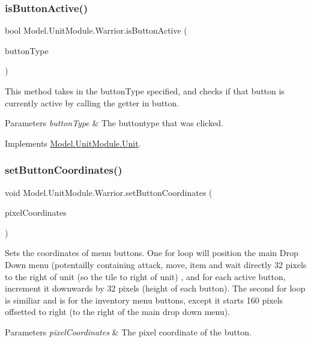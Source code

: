\subsubsection{\texorpdfstring{is\+Button\+Active()}{isButtonActive()}}
{\footnotesize\ttfamily bool Model.\+Unit\+Module.\+Warrior.\+is\+Button\+Active (\begin{DoxyParamCaption}\item[{\hyperlink{namespace_model_ac76b3489c9d704f49912608bd36cd0e7}{Button\+Type}}]{button\+Type }\end{DoxyParamCaption})\hspace{0.3cm}{\ttfamily [inline]}}

This method takes in the button\+Type specified, and checks if that button is currently active by calling the getter in button. 
\begin{DoxyParams}{Parameters}
{\em button\+Type} & The buttontype that was clicked. \\
\hline
\end{DoxyParams}


Implements \hyperlink{interface_model_1_1_unit_module_1_1_unit_a3931ef1523507e7261411dc79ee4e4af}{Model.\+Unit\+Module.\+Unit}.

\hypertarget{class_model_1_1_unit_module_1_1_warrior_ac988bd449f7f88fd8108278107cdba77}{}\label{class_model_1_1_unit_module_1_1_warrior_ac988bd449f7f88fd8108278107cdba77} 
\subsubsection{\texorpdfstring{set\+Button\+Coordinates()}{setButtonCoordinates()}}
{\footnotesize\ttfamily void Model.\+Unit\+Module.\+Warrior.\+set\+Button\+Coordinates (\begin{DoxyParamCaption}\item[{Vector2}]{pixel\+Coordinates }\end{DoxyParamCaption})\hspace{0.3cm}{\ttfamily [inline]}}

Sets the coordinates of menu buttons. One for loop will position the main Drop Down menu (potentailly containing attack, move, item and wait directly 32 pixels to the right of unit (so the tile to right of unit) , and for each active button, increment it downwards by 32 pixels (height of each button). The second for loop is similiar and is for the inventory menu buttons, except it starts 160 pixels offsetted to right (to the right of the main drop down menu). 
\begin{DoxyParams}{Parameters}
{\em pixel\+Coordinates} & The pixel coordinate of the button. \\
\hline
\end{DoxyParams}


